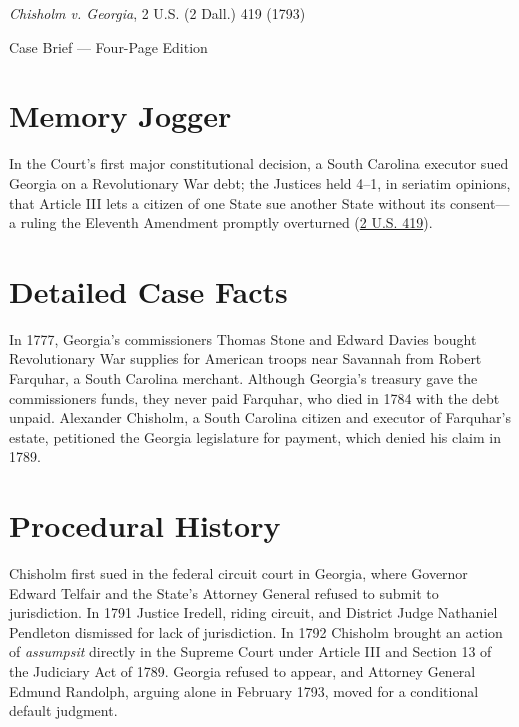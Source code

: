 \documentclass[12pt]{article}
\begin{document}
\begin{center}
{\LARGE \textit{Chisholm v. Georgia}, 2 U.S. (2 Dall.) 419 (1793)\par}
\vspace{0.8em}
{\large Case Brief --- Four-Page Edition\par}
\end{center}
\vspace{1em}

\section{Memory Jogger}

In the Court's first major constitutional decision, a South Carolina executor sued Georgia on a Revolutionary War debt; the Justices held 4--1, in seriatim opinions, that Article III lets a citizen of one State sue another State without its consent---a ruling the Eleventh Amendment promptly overturned (\href{https://supreme.justia.com/cases/federal/us/2/419/}{2 U.S. 419}).

\section{Detailed Case Facts}

In 1777, Georgia's commissioners Thomas Stone and Edward Davies bought Revolutionary War supplies for American troops near Savannah from Robert Farquhar, a South Carolina merchant. Although Georgia's treasury gave the commissioners funds, they never paid Farquhar, who died in 1784 with the debt unpaid. Alexander Chisholm, a South Carolina citizen and executor of Farquhar's estate, petitioned the Georgia legislature for payment, which denied his claim in 1789.

\section{Procedural History}

Chisholm first sued in the federal circuit court in Georgia, where Governor Edward Telfair and the State's Attorney General refused to submit to jurisdiction. In 1791 Justice Iredell, riding circuit, and District Judge Nathaniel Pendleton dismissed for lack of jurisdiction. In 1792 Chisholm brought an action of \emph{assumpsit} directly in the Supreme Court under Article III and Section 13 of the Judiciary Act of 1789. Georgia refused to appear, and Attorney General Edmund Randolph, arguing alone in February 1793, moved for a conditional default judgment.
\end{document}
